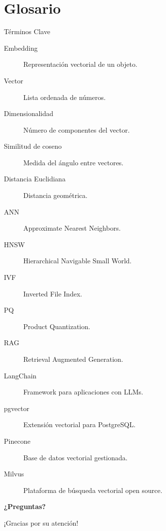 \documentclass[aspectratio=169, 10pt, xcolor=table]{beamer}
\begin{document}
\section{Glosario}

\begin{frame}{Términos Clave}
    \begin{description}
        \item[Embedding] Representación vectorial de un objeto.
        \item[Vector] Lista ordenada de números.
        \item[Dimensionalidad] Número de componentes del vector.
        \item[Similitud de coseno] Medida del ángulo entre vectores.
        \item[Distancia Euclidiana] Distancia geométrica.
        \item[ANN] Approximate Nearest Neighbors.
        \item[HNSW] Hierarchical Navigable Small World.
        \item[IVF] Inverted File Index.
        \item[PQ] Product Quantization.
        \item[RAG] Retrieval Augmented Generation.
        \item[LangChain] Framework para aplicaciones con LLMs.
        \item[pgvector] Extensión vectorial para PostgreSQL.
        \item[Pinecone] Base de datos vectorial gestionada.
        \item[Milvus] Plataforma de búsqueda vectorial open source.
    \end{description}
\end{frame}

\begin{frame}
    \centering
    \Huge \textbf{¿Preguntas?}
    
    \vspace{1cm}
    \large ¡Gracias por su atención!
\end{frame}
\end{document}

